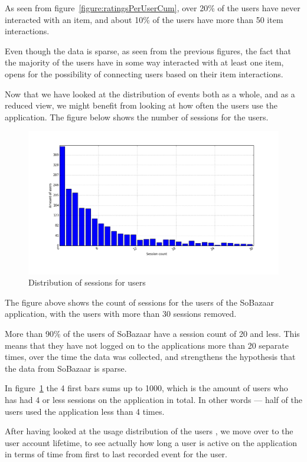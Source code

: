         As seen from figure~\ref{figure:ratingsPerUserCum}, over 20\% of the users have never interacted with an item, and about 10\% of the users have more than 50 item interactions.

        Even though the data is sparse, as seen from the previous figures, the fact that the majority of the users have in some way interacted with at least one item, opens for the possibility of connecting users based on their item interactions.

        Now that we have looked at the distribution of events both as a whole, and as a reduced view, we might benefit from looking at how often the users use the application. The figure below shows the number of sessions for the users.

    \begin{figure}[H]
        \includegraphics[width=5in]{image/sessiondistribution.png}
        \centering
        \caption{Distribution of sessions for users}
    \label{figure:sessCountDist}
    \end{figure}
        The figure above shows the count of sessions for the users of the SoBazaar application, with the users with more than 30 sessions removed.

        More than 90\% of the users of SoBazaar have a session count of 20 and less.
        This means that they have not logged on to the applications more than 20 separate times, over the time the data was collected, and strengthens the hypothesis that the data from SoBazaar is sparse.

        In figure~\ref{figure:sessCountDist} the 4 first bars sums up to 1000, which is the amount of users who has had 4 or less sessions on the application in total. In other words --- half of the users used the application less than 4 times.

        After having looked at the usage distribution of the users , we move over to the user account lifetime, to see actually how long a user is active on the application in terms of time from first to last recorded event for the user.

